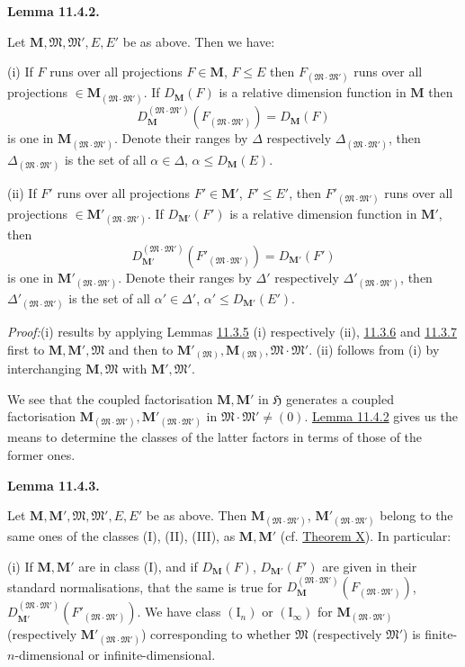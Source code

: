 \documentclass[12pt,b5paper,twoside]{article}
\newcommand{\Hspace}{\mathfrak H}
\newcommand{\M}{\mathbf M}
\newcommand{\Lemma}[1]{%
  \par\smallskip\noindent\phantomsection\label{lem:#1}\textbf{Lemma #1.}\enspace
}
\newcommand{\Proof}{\par\noindent\textit{Proof:}\enspace}
\newcommand{\lemref}[1]{\hyperref[lem:#1]{Lemma #1}}
\newcommand{\thmref}[1]{\hyperref[thm:#1]{Theorem #1}}
\begin{document}
\Lemma{11.4.2}
Let $\M,\mathfrak M,\mathfrak M',E,E'$ be as above. Then we have:

(i) If $F$ runs over all projections $F\in\M$, $F\leq E$ then
$F_{(\mathfrak M\cdot\mathfrak M')}$ runs over all projections
$\in\M_{(\mathfrak M\cdot\mathfrak M')}$. If $D_{\M}(F)$ is a relative
dimension function in $\M$ then
\[
 D_{\M}^{(\mathfrak M\cdot\mathfrak M')}
 (F_{(\mathfrak M\cdot\mathfrak M')})=D_{\M}(F)
\]
is one in $\M_{(\mathfrak M\cdot\mathfrak M')}$. Denote their ranges by
$\Delta$ respectively $\Delta_{(\mathfrak M\cdot\mathfrak M')}$, then
$\Delta_{(\mathfrak M\cdot\mathfrak M')}$ is the set of all
$\alpha\in\Delta$, $\alpha\leq D_{\M}(E)$.

(ii) If $F'$ runs over all projections $F'\in\M'$, $F'\leq E'$, then
$F'_{(\mathfrak M\cdot\mathfrak M')}$ runs over all projections
$\in\M'_{(\mathfrak M\cdot\mathfrak M')}$. If $D_{\M'}(F')$ is a
relative dimension function in $\M'$, then
\[
 D_{\M'}^{(\mathfrak M\cdot\mathfrak M')}
 (F'_{(\mathfrak M\cdot\mathfrak M')})=D_{\M'}(F')
\]
is one in $\M'_{(\mathfrak M\cdot\mathfrak M')}$. Denote their ranges by
$\Delta'$ respectively $\Delta'_{(\mathfrak M\cdot\mathfrak M')}$, then
$\Delta'_{(\mathfrak M\cdot\mathfrak M')}$ is the set of all
$\alpha'\in\Delta'$, $\alpha'\leq D_{\M'}(E')$.

\Proof (i) results by applying Lemmas \hyperref[lem:11.3.5]{11.3.5} (i)
respectively (ii), \hyperref[lem:11.3.6]{11.3.6} and
\hyperref[lem:11.3.7]{11.3.7} first to
$\M,\M',\mathfrak M$ and then to
$\M'_{(\mathfrak M)},\M_{(\mathfrak M)},
\mathfrak M\cdot\mathfrak M'$. (ii) follows from (i) by interchanging
$\M,\mathfrak M$ with $\M',\mathfrak M'$.

We see that the coupled factorisation $\M,\M'$ in $\Hspace$ generates a
coupled factorisation
$\M_{(\mathfrak M\cdot\mathfrak M')},
\M'_{(\mathfrak M\cdot\mathfrak M')}$ in
$\mathfrak M\cdot\mathfrak M'\ne(0)$. \lemref{11.4.2} gives us the
means to determine the classes of the latter factors in terms of those of
the former ones.

\Lemma{11.4.3}
Let $\M,\M',\mathfrak M,\mathfrak M',E,E'$ be as above. Then
$\M_{(\mathfrak M\cdot\mathfrak M')}$,
$\M'_{(\mathfrak M\cdot\mathfrak M')}$ belong to the same ones of the
classes (I), (II), (III), as $\M,\M'$ (cf. \thmref{X}). In particular:

(i) If $\M,\M'$ are in class (I), and if $D_{\M}(F)$,
$D_{\M'}(F')$ are given in their standard normalisations, that the same is
true for
$D_{\M}^{(\mathfrak M\cdot\mathfrak M')}
(F_{(\mathfrak M\cdot\mathfrak M')})$,
$D_{\M'}^{(\mathfrak M\cdot\mathfrak M')}
(F'_{(\mathfrak M\cdot\mathfrak M')})$. We have class
$(\mathrm I_n)$ or $(\mathrm I_\infty)$ for
$\M_{(\mathfrak M\cdot\mathfrak M')}$ (respectively
$\M'_{(\mathfrak M\cdot\mathfrak M')}$) corresponding to whether
$\mathfrak M$ (respectively $\mathfrak M'$) is finite-$n$-dimensional or
infinite-dimensional.
\end{document}
